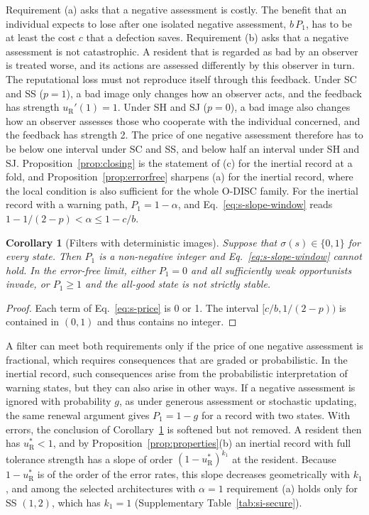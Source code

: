 \documentclass[10pt]{wlscirep}
\newcommand{\uR}{u_{\mathrm{R}}^{*}}
\newcommand{\Pone}{P_{1}}                  %
\theoremstyle{plain}
\newtheorem{corollary}[lemma]{Corollary}
\theoremstyle{remark}
\begin{document}
Requirement (a) asks that a negative assessment is costly. The benefit that an individual expects to lose after one isolated negative assessment, $b\,\Pone$, has to be at least the cost $c$ that a defection saves. Requirement (b) asks that a negative assessment is not catastrophic. A resident that is regarded as bad by an observer is treated worse, and its actions are assessed differently by this observer in turn. The reputational loss must not reproduce itself through this feedback. Under SC and SS ($p=1$), a bad image only changes how an observer acts, and the feedback has strength $u_{\mathrm R}'(1)=1$. Under SH and SJ ($p=0$), a bad image also changes how an observer assesses those who cooperate with the individual concerned, and the feedback has strength 2. The price of one negative assessment therefore has to be below one interval under SC and SS, and below half an interval under SH and SJ. Proposition~\ref{prop:closing} is the statement of (c) for the inertial record at a fold, and Proposition~\ref{prop:errorfree} sharpens (a) for the inertial record, where the local condition is also sufficient for the whole O-DISC family. For the inertial record with a warning path, $\Pone=1-\alpha$, and Eq.~\eqref{eq:s-slope-window} reads $1-1/(2-p)<\alpha\leq1-c/b$.

\begin{corollary}[Filters with deterministic images]\label{cor:deterministic}
Suppose that $\sigma(s)\in\{0,1\}$ for every state. Then $\Pone$ is a non-negative integer and Eq.~\eqref{eq:s-slope-window} cannot hold. In the error-free limit, either $\Pone=0$ and all sufficiently weak opportunists invade, or $\Pone\geq1$ and the all-good state is not strictly stable.
\end{corollary}
\begin{proof}
Each term of Eq.~\eqref{eq:s-price} is 0 or 1. The interval $[c/b,1/(2-p))$ is contained in $(0,1)$ and thus contains no integer.
\end{proof}

A filter can meet both requirements only if the price of one negative assessment is fractional, which requires consequences that are graded or probabilistic. In the inertial record, such consequences arise from the probabilistic interpretation of warning states, but they can also arise in other ways. If a negative assessment is ignored with probability $g$, as under generous assessment or stochastic updating, the same renewal argument gives $\Pone=1-g$ for a record with two states. With errors, the conclusion of Corollary~\ref{cor:deterministic} is softened but not removed. A resident then has $\uR<1$, and by Proposition~\ref{prop:properties}(b) an inertial record with full tolerance strength has a slope of order $(1-\uR)^{k_1}$ at the resident. Because $1-\uR$ is of the order of the error rates, this slope decreases geometrically with $k_1$, and among the selected architectures with $\alpha=1$ requirement (a) holds only for SS $(1,2)$, which has $k_1=1$ (Supplementary Table~\ref{tab:si-secure}).
\end{document}

